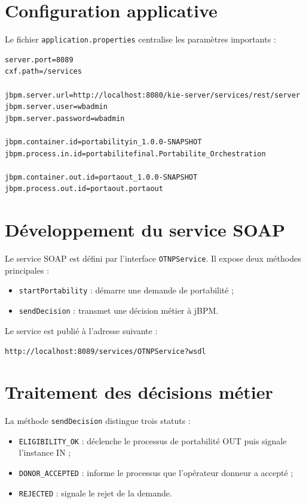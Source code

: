 \documentclass[12pt,a4paper]{report}
\begin{document}
\section{Configuration applicative}
Le fichier \texttt{application.properties} centralise les paramètres importants :
\begin{lstlisting}[caption={Configuration principale}]
server.port=8089
cxf.path=/services

jbpm.server.url=http://localhost:8080/kie-server/services/rest/server
jbpm.server.user=wbadmin
jbpm.server.password=wbadmin

jbpm.container.id=portabilityin_1.0.0-SNAPSHOT
jbpm.process.in.id=portabilitefinal.Portabilite_Orchestration

jbpm.container.out.id=portaout_1.0.0-SNAPSHOT
jbpm.process.out.id=portaout.portaout
\end{lstlisting}

\section{Développement du service SOAP}
Le service SOAP est défini par l'interface \texttt{OTNPService}. Il expose deux méthodes principales :
\begin{itemize}
    \item \texttt{startPortability} : démarre une demande de portabilité ;
    \item \texttt{sendDecision} : transmet une décision métier à jBPM.
\end{itemize}

Le service est publié à l'adresse suivante :
\begin{center}
\texttt{http://localhost:8089/services/OTNPService?wsdl}
\end{center}

\section{Traitement des décisions métier}
La méthode \texttt{sendDecision} distingue trois statuts :
\begin{itemize}
    \item \texttt{ELIGIBILITY\_OK} : déclenche le processus de portabilité OUT puis signale l'instance IN ;
    \item \texttt{DONOR\_ACCEPTED} : informe le processus que l'opérateur donneur a accepté ;
    \item \texttt{REJECTED} : signale le rejet de la demande.
\end{itemize}
\end{document}
